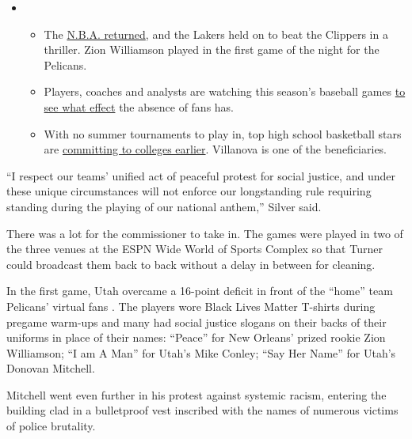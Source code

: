 \begin{itemize}
\item
  \begin{itemize}
  \tightlist
  \item
    The
    \href{https://www.nytimes.com/2020/07/30/sports/basketball/clippers-lakers.html?action=click\&pgtype=Article\&state=default\&region=MAIN_CONTENT_2\&context=storylines_keepup}{N.B.A.
    returned}, and the Lakers held on to beat the Clippers in a
    thriller. Zion Williamson played in the first game of the night for
    the Pelicans.
  \item
    Players, coaches and analysts are watching this season's baseball
    games
    \href{https://www.nytimes.com/2020/07/31/sports/baseball/baseball-empty-stadiums-effects.html?action=click\&pgtype=Article\&state=default\&region=MAIN_CONTENT_2\&context=storylines_keepup}{to
    see what effect} the absence of fans has.
  \item
    With no summer tournaments to play in, top high school basketball
    stars are
    \href{https://www.nytimes.com/2020/07/30/sports/ncaabasketball/college-basketball-recruiting.html?action=click\&pgtype=Article\&state=default\&region=MAIN_CONTENT_2\&context=storylines_keepup}{committing
    to colleges earlier}. Villanova is one of the beneficiaries.
  \end{itemize}
\end{itemize}

``I respect our teams' unified act of peaceful protest for social
justice, and under these unique circumstances will not enforce our
longstanding rule requiring standing during the playing of our national
anthem,'' Silver said.

There was a lot for the commissioner to take in. The games were played
in two of the three venues at the ESPN Wide World of Sports Complex so
that Turner could broadcast them back to back without a delay in between
for cleaning.

In the first game, Utah overcame a 16-point deficit in front of the
``home'' team Pelicans' virtual fans . The players wore Black Lives
Matter T-shirts during pregame warm-ups and many had social justice
slogans on their backs of their uniforms in place of their names:
``Peace'' for New Orleans' prized rookie Zion Williamson; ``I am A Man''
for Utah's Mike Conley; ``Say Her Name'' for Utah's Donovan Mitchell.

Mitchell went even further in his protest against systemic racism,
entering the building clad in a bulletproof vest inscribed with the
names of numerous victims of police brutality.

